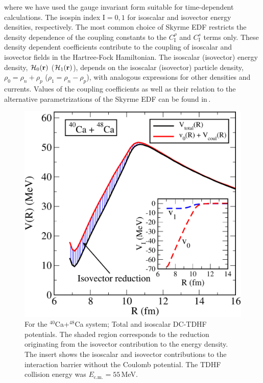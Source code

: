where we have used the gauge invariant form suitable for time-dependent calculations.
The isospin index $\mathrm{I}=0,1$ for isoscalar and isovector energy densities, respectively.
The most common choice of Skyrme EDF restricts the density dependence of the
coupling constants to the $C_\mathrm{I}^{\rho}$ and $C_\mathrm{I}^s$ terms only.
These density dependent coefficients contribute to the coupling of isoscalar and isovector fields
in the Hartree-Fock Hamiltonian.
The isoscalar (isovector) energy density, ${\cal H}_0(\mathbf{r})$ (${\cal H}_1(\mathbf{r})$), depends on the isoscalar (isovector) particle
density, $\rho_0 = \rho_n + \rho_p$ ($\rho_1 = \rho_n - \rho_p$), with analogous expressions for other densities and
currents.
Values of the coupling
coefficients as well as their relation to the alternative parametrizations of the Skyrme
EDF can be found in\,\citep{dobaczewski1995}.
\begin{figure}
	\includegraphics*[width=\textwidth]{../Figures/Isospin/V_40_48Ca.pdf}
	\caption{For the $^{40}$Ca+$^{48}$Ca system;
		Total and isoscalar DC-TDHF potentials. The shaded region
		corresponds to the reduction originating from the isovector contribution to the energy
		density. The insert shows the isoscalar and isovector contributions to the interaction barrier
		without the Coulomb potential.
		The TDHF collision energy was $E_\mathrm{c.m.}=55$\,MeV.}
	\label{fig:CaCa}
\end{figure}

